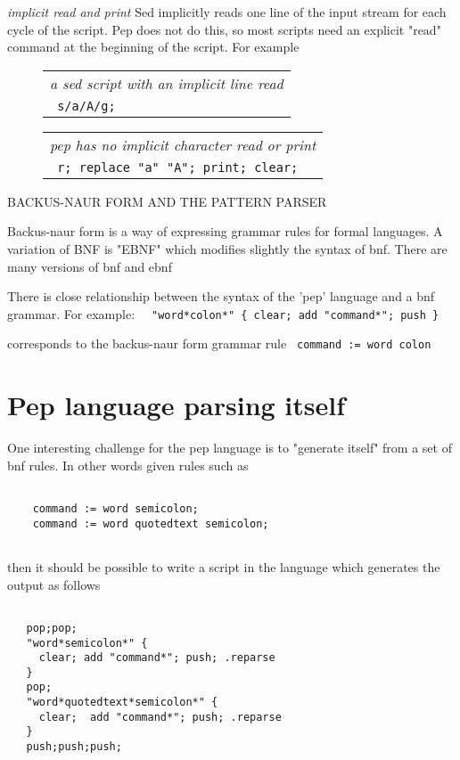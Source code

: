 \documentclass[a4paper,12pt]{article}
\begin{document}
 \emph{ implicit read and print }
      Sed implicitly reads one line of the input stream for
      each cycle of the script. Pep does not do this, so
      most scripts need an explicit "read" command at the
      beginning of the script. For example
 \begin{figure}
 \begin{tabular}{ l }
 \emph{ a sed script with an implicit line read } \\ 
 \verb| s/a/A/g; |
 \end{tabular} 
 \end{figure}
 \begin{figure}
 \begin{tabular}{ l }
 \emph{ pep has no implicit character read or print } \\ 
 \verb| r; replace "a" "A"; print; clear; |
 \end{tabular} 
 \end{figure}

BACKUS-NAUR FORM AND THE PATTERN PARSER

  Backus-naur form is a way of expressing grammar rules for formal languages.
  A variation of BNF is "EBNF" which modifies slightly the syntax of bnf.
  There are many versions of bnf and ebnf

  There is close relationship between the syntax of the 'pep' language
  and a bnf grammar. For example: 
 \verb|  "word*colon*" { clear; add "command*"; push } |


  corresponds to the backus-naur form grammar rule 
 \verb| command := word colon |


\section{Pep language parsing itself}

  One interesting challenge for the pep language is to "generate itself"
  from a set of bnf rules. In other words given rules such as 
 \begin{lstlisting}[breaklines] 

    command := word semicolon;
    command := word quotedtext semicolon;
  
 \end{lstlisting} 


  then it should be possible to write a script in the language
  which generates the output as follows 
 \begin{lstlisting}[breaklines] 

   pop;pop;
   "word*semicolon*" {
     clear; add "command*"; push; .reparse
   }
   pop;
   "word*quotedtext*semicolon*" {
     clear;  add "command*"; push; .reparse
   }
   push;push;push;
  
 \end{lstlisting} 
\end{document}
